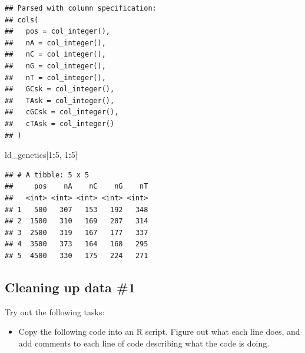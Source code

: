 \documentclass[]{book}
\makeatletter
\newenvironment{Shaded}{\begin{snugshade}}{\end{snugshade}}
\newcommand{\DecValTok}[1]{\textcolor[rgb]{0.00,0.00,0.81}{#1}}
\newcommand{\OperatorTok}[1]{\textcolor[rgb]{0.81,0.36,0.00}{\textbf{#1}}}
\newcommand{\NormalTok}[1]{#1}
\providecommand{\tightlist}{%
  \setlength{\itemsep}{0pt}\setlength{\parskip}{0pt}}
\newenvironment{kframe}{%
\medskip{}
\setlength{\fboxsep}{.8em}
 \def\at@end@of@kframe{}%
 \ifinner\ifhmode%
  \def\at@end@of@kframe{\end{minipage}}%
  \begin{minipage}{\columnwidth}%
 \fi\fi%
 \def\FrameCommand##1{\hskip\@totalleftmargin \hskip-\fboxsep
 \colorbox{shadecolor}{##1}\hskip-\fboxsep
     \hskip-\linewidth \hskip-\@totalleftmargin \hskip\columnwidth}%
 \MakeFramed {\advance\hsize-\width
   \@totalleftmargin\z@ \linewidth\hsize
   \@setminipage}}%
 {\par\unskip\endMakeFramed%
 \at@end@of@kframe}
\renewenvironment{Shaded}{\begin{kframe}}{\end{kframe}}
\theoremstyle{definition}
\theoremstyle{definition}
\theoremstyle{definition}
\theoremstyle{remark}
\makeatother
\begin{document}
\begin{verbatim}
## Parsed with column specification:
## cols(
##   pos = col_integer(),
##   nA = col_integer(),
##   nC = col_integer(),
##   nG = col_integer(),
##   nT = col_integer(),
##   GCsk = col_integer(),
##   TAsk = col_integer(),
##   cGCsk = col_integer(),
##   cTAsk = col_integer()
## )
\end{verbatim}

\begin{Shaded}
\begin{Highlighting}[]
\NormalTok{ld_genetics[}\DecValTok{1}\OperatorTok{:}\DecValTok{5}\NormalTok{, }\DecValTok{1}\OperatorTok{:}\DecValTok{5}\NormalTok{]}
\end{Highlighting}
\end{Shaded}

\begin{verbatim}
## # A tibble: 5 x 5
##     pos    nA    nC    nG    nT
##   <int> <int> <int> <int> <int>
## 1   500   307   153   192   348
## 2  1500   310   169   207   314
## 3  2500   319   167   177   337
## 4  3500   373   164   168   295
## 5  4500   330   175   224   271
\end{verbatim}

\subsection{Cleaning up data \#1}\label{cleaning-up-data-1}

Try out the following tasks:

\begin{itemize}
\tightlist
\item
  Copy the following code into an R script. Figure out what each line
  does, and add comments to each line of code describing what the code
  is doing.
\end{itemize}
\end{document}
